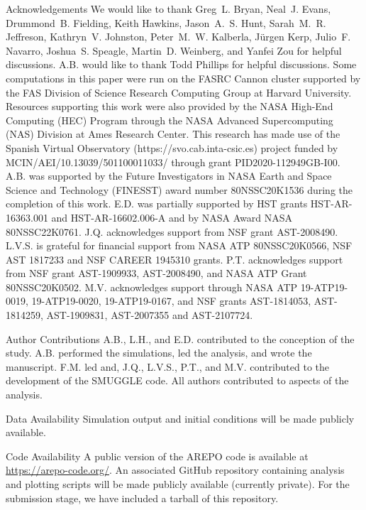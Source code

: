 \documentclass[twoside]{natureprintstyle}
\newcommand{\AREPO}{\textsc{AREPO}}
\begin{document}



\begin{addendum}
  
\item [Acknowledgements] We would like to thank Greg~L. Bryan, Neal~J. Evans,
Drummond~B. Fielding, Keith Hawkins, Jason~A.~S. Hunt, Sarah~M.~R. Jeffreson,
Kathryn~V. Johnston, Peter~M.~W. Kalberla, Jürgen Kerp, Julio~F. Navarro,
Joshua~S. Speagle, Martin~D. Weinberg, and Yanfei Zou for helpful discussions.
A.B. would like to thank Todd Phillips for helpful discussions. Some
computations in this paper were run on the FASRC Cannon cluster supported by
the FAS Division of Science Research Computing Group at Harvard University.
Resources supporting this work were also provided by the NASA High-End
Computing (HEC) Program through the NASA Advanced Supercomputing (NAS)
Division at Ames Research Center. This research has made use of the Spanish
Virtual Observatory (https://svo.cab.inta-csic.es) project funded by
MCIN/AEI/10.13039/501100011033/ through grant PID2020-112949GB-I00. A.B. was
supported by the Future Investigators in NASA Earth and Space Science and
Technology (FINESST) award number 80NSSC20K1536 during the completion of this
work. E.D. was partially supported by HST grants HST-AR-16363.001 and
HST-AR-16602.006-A and by NASA Award NASA 80NSSC22K0761. J.Q. acknowledges
support from NSF grant AST-2008490. L.V.S. is grateful for financial support
from NASA ATP 80NSSC20K0566, NSF AST 1817233 and NSF CAREER 1945310 grants.
P.T. acknowledges support from NSF grant AST-1909933, AST-2008490, and NASA
ATP Grant 80NSSC20K0502. M.V. acknowledges support through NASA ATP
19-ATP19-0019, 19-ATP19-0020, 19-ATP19-0167, and NSF grants AST-1814053,
AST-1814259, AST-1909831, AST-2007355 and AST-2107724.

\item[Author Contributions] A.B., L.H., and E.D. contributed to the conception
of the study. A.B. performed the simulations, led the analysis, and wrote the
manuscript. F.M. led and, J.Q., L.V.S., P.T., and M.V. contributed to the
development of the SMUGGLE code. All authors contributed to aspects of the
analysis.

\item[Data Availability]  Simulation output and initial conditions will be
made publicly available.
    
\item[Code Availability] A public version of the \AREPO{} code is available at
\url{https://arepo-code.org/}. An associated GitHub repository containing
analysis and plotting scripts will be made publicly available (currently
private). For the submission stage, we have included a tarball of this
repository.
    
\end{addendum}
\end{document}
